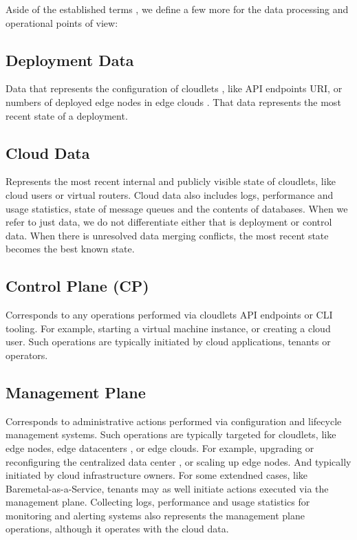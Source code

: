 \documentclass[conference]{IEEEtran}
\begin{document}
Aside of the established terms \cite{b3}, we define a few more for the data
processing and operational points of view:

\subsection{Deployment Data}

Data that represents the configuration of cloudlets \cite{b3}, like API
endpoints URI, or numbers of deployed edge nodes \cite{b3} in edge clouds
\cite{b3}. That data represents the most recent state of a deployment.

\subsection{Cloud Data}

Represents the most recent internal and publicly visible state of cloudlets,
like cloud users or virtual routers. Cloud data also includes logs, performance
and usage statistics, state of message queues and the contents of databases.
When we refer to just data, we do not differentiate either that is deployment
or control data. When there is unresolved data merging conflicts, the most
recent state becomes the best known state.

\subsection{Control Plane (CP)}

Corresponds to any operations performed via cloudlets API endpoints
or CLI tooling. For example, starting a virtual machine instance, or creating a
cloud user. Such operations are typically initiated by cloud applications,
tenants or operators.

\subsection{Management Plane}

Corresponds to administrative actions performed via configuration and lifecycle
management systems. Such operations are typically targeted for cloudlets, like
edge nodes, edge datacenters \cite{b3}, or edge clouds. For example, upgrading
or reconfiguring the centralized data center \cite{b3}, or scaling up edge
nodes. And typically initiated by cloud infrastructure owners. For some
extendned cases, like Baremetal-as-a-Service, tenants may as well initiate
actions executed via the management plane. Collecting logs, performance and
usage statistics for monitoring and alerting systems also represents the
management plane operations, although it operates with the cloud data.
\end{document}
